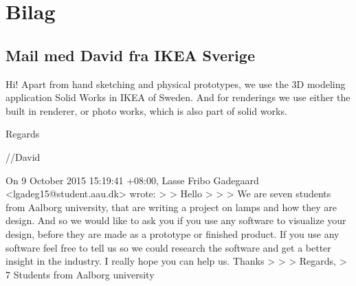 \section{Bilag}

\subsection{Mail med David fra IKEA Sverige}
Hi! Apart from hand sketching and physical prototypes, we use the 3D modeling application Solid Works in IKEA of Sweden. And for renderings we use either the built in renderer, or photo works, which is also part of solid works.

Regards 

//David 

On 9 October 2015 15:19:41 +08:00, Lasse Fribo Gadegaard <lgadeg15@student.aau.dk> wrote:
> 
> Hello
> 
> 
> We are seven students from Aalborg university, that are writing a project on lamps and how they are design. And so we would like to ask you if you use any software to visualize your design, before they are made as a prototype or finished product. If you use any software feel free to tell us so we could research the software and get a better insight in the industry. I really hope you can help us. Thanks
> 
> 
> Regards,
> 7 Students from Aalborg university